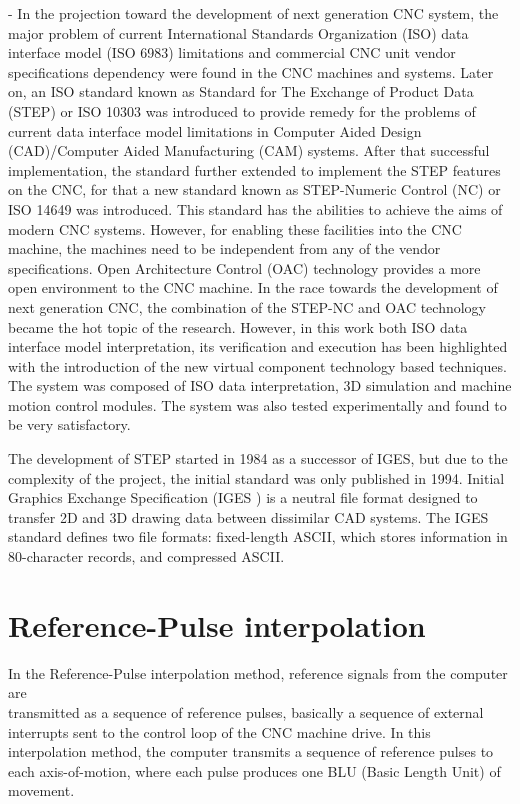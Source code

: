 \begin{tcolorbox}

\cite{Yusri_2013} - In the projection toward the development of next generation CNC system, the major problem of current International Standards Organization (ISO) data interface model (ISO 6983) limitations and commercial CNC unit vendor specifications dependency were found in the CNC machines and systems. Later on, an ISO standard known as Standard for The Exchange of Product Data (STEP) or ISO 10303 was introduced to provide remedy for the problems of current data interface model limitations in Computer Aided Design (CAD)/Computer Aided Manufacturing (CAM) systems. After that successful implementation, the standard further extended to implement the STEP features on the CNC, for that a new standard known as STEP-Numeric Control (NC) or ISO 14649 was introduced. This standard has the abilities to achieve the aims of modern CNC systems. However, for enabling these facilities into the CNC machine, the machines need to be independent from any of the vendor specifications. Open Architecture Control (OAC) technology provides a more open environment to the CNC machine. In the race towards the development of next generation CNC, the combination of the STEP-NC and OAC technology became the hot topic of the research. However, in this work both ISO data interface model interpretation, its verification and execution has been highlighted with the introduction of the new virtual component technology based techniques. The system was composed of ISO data interpretation, 3D simulation and machine motion control modules. The system was also tested experimentally and found to be very satisfactory.

The development of STEP started in 1984 as a successor of IGES, but due to the complexity of the project, the initial standard was only published in 1994. Initial Graphics Exchange Specification (IGES ) is a neutral file format designed to transfer 2D and 3D drawing data between dissimilar CAD systems. The IGES standard defines two file formats: fixed-length ASCII, which stores information in 80-character records, and compressed ASCII.


\end{tcolorbox}

\section{Reference-Pulse interpolation}

In the Reference-Pulse interpolation method, reference signals from the computer are \\transmitted as a sequence of reference pulses, basically a sequence of external interrupts sent to the control loop of the CNC machine drive. In this interpolation method, the computer transmits a sequence of reference pulses to each axis-of-motion, where each pulse produces one BLU (Basic Length Unit) of movement. 
\vspace*{1\baselineskip}

